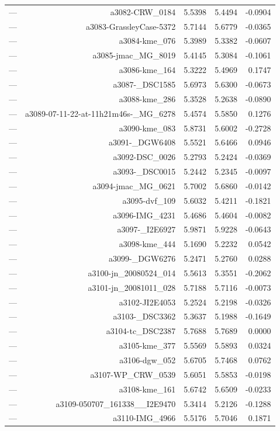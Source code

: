 \begin{table}[htbp]
\begin{tabular}{lrrrr}
— & a3082-CRW_0184 & 5.5398 & 5.4494 & -0.0904 \\
— & a3083-GrassleyCase-5372 & 5.7144 & 5.6779 & -0.0365 \\
— & a3084-kme_076 & 5.3989 & 5.3382 & -0.0607 \\
— & a3085-jmac_MG_8019 & 5.4145 & 5.3084 & -0.1061 \\
— & a3086-kme_164 & 5.3222 & 5.4969 & 0.1747 \\
— & a3087-_DSC1585 & 5.6973 & 5.6300 & -0.0673 \\
— & a3088-kme_286 & 5.3528 & 5.2638 & -0.0890 \\
— & a3089-07-11-22-at-11h21m46s-_MG_6278 & 5.4574 & 5.5850 & 0.1276 \\
— & a3090-kme_083 & 5.8731 & 5.6002 & -0.2728 \\
— & a3091-_DGW6408 & 5.5521 & 5.6466 & 0.0946 \\
— & a3092-DSC_0026 & 5.2793 & 5.2424 & -0.0369 \\
— & a3093-_DSC0015 & 5.2442 & 5.2345 & -0.0097 \\
— & a3094-jmac_MG_0621 & 5.7002 & 5.6860 & -0.0142 \\
— & a3095-dvf_109 & 5.6032 & 5.4211 & -0.1821 \\
— & a3096-IMG_4231 & 5.4686 & 5.4604 & -0.0082 \\
— & a3097-_I2E6927 & 5.9871 & 5.9228 & -0.0643 \\
— & a3098-kme_444 & 5.1690 & 5.2232 & 0.0542 \\
— & a3099-_DGW6276 & 5.2471 & 5.2760 & 0.0288 \\
— & a3100-jn_20080524_014 & 5.5613 & 5.3551 & -0.2062 \\
— & a3101-jn_20081011_028 & 5.7188 & 5.7116 & -0.0073 \\
— & a3102-JI2E4053 & 5.2524 & 5.2198 & -0.0326 \\
— & a3103-_DSC3362 & 5.3637 & 5.1988 & -0.1649 \\
— & a3104-tc_DSC2387 & 5.7688 & 5.7689 & 0.0000 \\
— & a3105-kme_377 & 5.5569 & 5.5893 & 0.0324 \\
— & a3106-dgw_052 & 5.6705 & 5.7468 & 0.0762 \\
— & a3107-WP_CRW_0539 & 5.6051 & 5.5853 & -0.0198 \\
— & a3108-kme_161 & 5.6742 & 5.6509 & -0.0233 \\
— & a3109-050707_161338__I2E9470 & 5.3414 & 5.2126 & -0.1288 \\
— & a3110-IMG_4966 & 5.5176 & 5.7046 & 0.1871 \\

\end{tabular}
\end{table}
